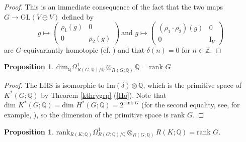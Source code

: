 \documentclass[11pt]{amsart}
\theoremstyle{plain}
\newtheorem{lemma}[theorem]{Lemma}
\newtheorem{proposition}[theorem]{Proposition}
\theoremstyle{definition}
\begin{document}
\begin{proof}
	This is an immediate consequence of the fact that the two maps $G \to \text{GL}(V\oplus V)$ defined by 
	\[g\mapsto \begin{pmatrix}\rho_1(g)& 0\\ 0&\rho_2(g)\end{pmatrix}\ \text{and }g\mapsto \begin{pmatrix}(\rho_1\cdot\rho_2)(g)&0\\ 0& \text{I}_V\end{pmatrix}\]
	are $G$-equivariantly homotopic (cf. \cite[Proof of Proposition 3.1]{BZ}) and that $\delta(n)=0$ for $n\in\mathbb{Z}$.
\end{proof}
\begin{proposition}\label{repringreg}
	$\text{dim}_\mathbb{Q}\Omega^1_{R(G; \mathbb{Q})/\mathbb{Q}}\otimes_{R(G; \mathbb{Q})}\mathbb{Q}=\text{rank }G$
\end{proposition}
\begin{proof}
	The LHS is isomorphic to $\text{Im}(\delta)\otimes\mathbb{Q}$, which is the primitive space of $K^*(G; \mathbb{Q})$ by Theorem \ref{kthrygrp} (\ref{Ho}). Note that $\text{dim }K^*(G; \mathbb{Q})=\text{dim }H^*(G; \mathbb{Q})=2^{\text{rank }G}$ (for the second equality, see, for example, \cite[Theorem 3.6]{F3}), so the dimension of the primitive space is $\text{rank }G$. 
\end{proof}
\begin{proposition}\label{rkkahler}
	$\text{rank}_{R(K; \mathbb{Q})}\Omega^1_{R(G; \mathbb{Q})/\mathbb{Q}}\otimes_{R(G; \mathbb{Q})}R(K; \mathbb{Q})=\text{rank }G$.
\end{proposition}
\end{document}
